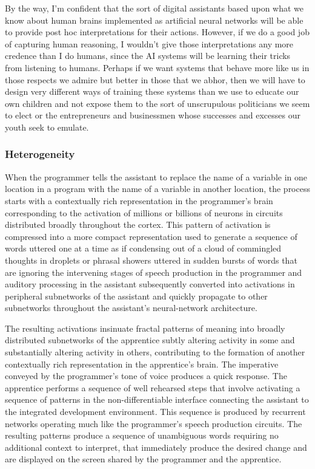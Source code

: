 By the way, I'm confident that the sort of digital assistants based upon what we know about human brains implemented as artificial neural networks will be able to provide post hoc interpretations for their actions. However, if we do a good job of capturing human reasoning, I wouldn't give those interpretations any more credence than I do humans, since the AI systems will be learning their tricks from listening to humans. Perhaps if we want systems that behave more like us in those respects we admire but better in those that we abhor, then we will have to design very different ways of training these systems than we use to educate our own children and not expose them to the sort of unscrupulous politicians we seem to elect or the entrepreneurs and businessmen whose successes and excesses our youth seek to emulate.


\subsubsection*{Heterogeneity}

When the programmer tells the assistant to replace the name of a variable in one location in a program with the name of a variable in another location, the process starts with a contextually rich representation in the programmer’s brain corresponding to the activation of millions or billions of neurons in circuits distributed broadly throughout the cortex. This pattern of activation is compressed into a more compact representation used to generate a sequence of words uttered one at a time as if condensing out of a cloud of commingled thoughts in droplets or phrasal showers uttered in sudden bursts of words that are \emdash{} ignoring the intervening stages of speech production in the programmer and auditory processing in the assistant \emdash{} subsequently converted into activations in peripheral subnetworks of the assistant and quickly propagate to other subnetworks throughout the assistant’s neural-network architecture. 

The resulting activations insinuate fractal patterns of meaning into broadly distributed subnetworks of the apprentice subtly altering activity in some and substantially altering activity in others, contributing to the formation of another contextually rich representation in the apprentice’s brain. The imperative conveyed by the programmer’s tone of voice produces a quick response. The apprentice performs a sequence of well rehearsed steps that involve activating a sequence of patterns in the non-differentiable interface connecting the assistant to the integrated development environment. This sequence is produced by recurrent networks operating much like the programmer’s speech production circuits. The resulting patterns produce a sequence of unambiguous words \emdash{} requiring no additional context to interpret, that immediately produce the desired change and are displayed on the screen shared by the programmer and the apprentice.

